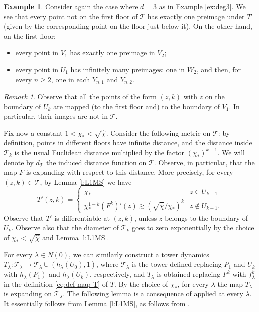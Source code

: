 \documentclass[11pt]{amsart}
\theoremstyle{plain}
\theoremstyle{definition}
\newtheorem{example}[thm]{Example}
\theoremstyle{remark}
\newtheorem{rmk}[thm]{Remark}
\begin{document}
\begin{example}\label{ex:deg3-preim}
Consider again the case where $d=3$ as in Example \ref{ex:deg3}. We see that every point not on the first floor of $\mathcal T$ 
has exactly one preimage under $T$ 
(given by the corresponding point on the floor just below it). On the other hand, on the first floor:
\begin{itemize}
\item every point in $V_1$ has exactly one preimage in $V_2$;
\item every point in $U_1$ has infinitely many preimages: one in $W_2$, and then, for every $n\geq 2$, one in each $Y_{n,1}$ and $Y_{n,2}$.
\end{itemize}

\begin{rmk}\label{rmk_bdryUk}
Observe that all the points of the form $(z,k)$ with $z$ on the 
boundary
of $U_k$ are mapped
(to the first floor and) to the boundary of $V_1$. In particular, their images are not in $\mathcal T$.
\end{rmk}

\end{example}



Fix now a 
constant $1<\chi_* <\sqrt{\hat \chi}$.
Consider the following metric on $\mathcal T$: by definition, points in different floors have infinite distance, and the distance inside $\mathcal T_k$ is the usual Euclidean distance multiplied by the factor $(\chi_*)^{k-1}$. We will denote by $d_{\mathcal T}$ 
the induced distance function on $\mathcal T$.
Observe, in particular, that the map $F$ is expanding with respect to this distance. More precisely,
for every
$(z,k)\in \mathcal T$,
by Lemma \ref{l:L1MS}
we have
\[
T' (z,k)= \begin{cases}
\chi_* & z \in U_{k+1}\\
\chi_*^{1-k} (F^k)'(z) \gtrsim 
(\sqrt{\hat \chi } / \chi_*)^{k}
& z\notin \overline{U_{k+1}}.
\end{cases}
\]
Observe that $T'$ is
differentiable at $(z,k)$, unless $z$ belongs to the boundary of $U_{k}$.
Observe also that the diameter of $\mathcal T_k$ goes to zero exponentially by the choice of $\chi_*<\sqrt{\hat \chi}$ and Lemma \ref{l:L1MS}.

\medskip

For every $\lambda\in N(0)$,
we can similarly construct a tower dynamics $T_\lambda \colon \mathcal T_\lambda \to \mathcal T_\lambda 
\cup (h_{ \lambda} (U_0), 1)$, where
$\mathcal T_\lambda$ is the tower defined 
replacing
$P_1$ and $U_k$ with
$h_\lambda (P_1)$ and $h_\lambda (U_k)$, respectively, and $T_\lambda$ is obtained replacing
$F^k$ with
$f_\lambda^k$
in the definition 
\eqref{eq:def-map-T}
of $T$.
By the choice of $\chi_*$, for every
$\lambda$ the map
$T_\lambda$ 
is expanding on $\mathcal T_\lambda$. The following lemma is a consequence of \cite[Lemma 2]{MakSmir03} applied at every $\lambda$. It essentially follows from Lemma \ref{l:L1MS}, as
\cite[Lemma 2]{MakSmir03} follows from \cite[Lemma 1]{MakSmir03}.
\end{document}
